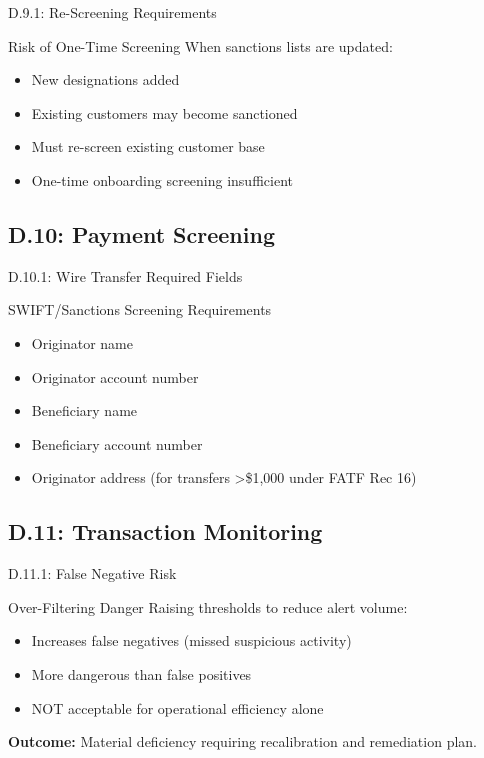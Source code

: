 \documentclass{beamer}
\begin{document}
		\begin{frame}{D.9.1: Re-Screening Requirements}
			\begin{block}{Risk of One-Time Screening}
				When sanctions lists are updated:
				\begin{itemize}
					\item New designations added
					\item Existing customers may become sanctioned
					\item Must re-screen existing customer base
					\item One-time onboarding screening insufficient
				\end{itemize}
			\end{block}
		\end{frame}
		
		\subsection{D.10: Payment Screening}
		
		\begin{frame}{D.10.1: Wire Transfer Required Fields}
			\begin{block}{SWIFT/Sanctions Screening Requirements}
				\begin{itemize}
					\item Originator name
					\item Originator account number
					\item Beneficiary name
					\item Beneficiary account number
					\item Originator address (for transfers >\$1,000 under FATF Rec 16)
				\end{itemize}
			\end{block}
		\end{frame}
		
		\subsection{D.11: Transaction Monitoring}
		
		\begin{frame}{D.11.1: False Negative Risk}
			\begin{block}{Over-Filtering Danger}
				Raising thresholds to reduce alert volume:
				\begin{itemize}
					\item Increases false negatives (missed suspicious activity)
					\item More dangerous than false positives
					\item NOT acceptable for operational efficiency alone
				\end{itemize}
			\end{block}
			\textbf{Outcome:} Material deficiency requiring recalibration and remediation plan.
		\end{frame}
		
\end{document}
